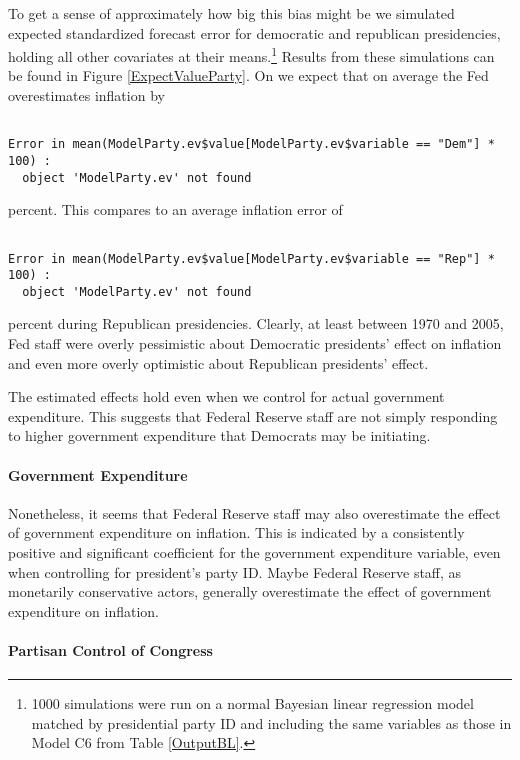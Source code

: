\documentclass[a4paper]{article}\usepackage{graphicx, color}
\begin{document}
To get a sense of approximately how big this bias might be we simulated expected standardized forecast error for democratic and republican presidencies, holding all other covariates at their means.\footnote{1000 simulations were run on a normal Bayesian linear regression model matched by presidential party ID and including the same variables as those in Model C6 from Table \ref{OutputBL}.} Results from these simulations can be found in Figure \ref{ExpectValueParty}. On we expect that on average the Fed overestimates inflation by \begin{verbatim}

Error in mean(ModelParty.ev$value[ModelParty.ev$variable == "Dem"] * 100) : 
  object 'ModelParty.ev' not found

\end{verbatim}
 percent. This compares to an average inflation error of \begin{verbatim}

Error in mean(ModelParty.ev$value[ModelParty.ev$variable == "Rep"] * 100) : 
  object 'ModelParty.ev' not found

\end{verbatim}
 percent during Republican presidencies. Clearly, at least between 1970 and 2005, Fed staff were overly pessimistic about Democratic presidents' effect on inflation and even more overly optimistic about Republican presidents' effect. 

The estimated effects hold even when we control for actual government expenditure. This suggests that Federal Reserve staff are not simply responding to higher government expenditure that Democrats may be initiating.

\paragraph{Government Expenditure}

Nonetheless, it seems that Federal Reserve staff may also overestimate the effect of government expenditure on inflation. This is indicated by a consistently positive and significant coefficient for the government expenditure variable, even when controlling for president's party ID. Maybe Federal Reserve staff, as monetarily conservative actors, generally overestimate the effect of government expenditure on inflation.  

\paragraph{Partisan Control of Congress}
\end{document}
